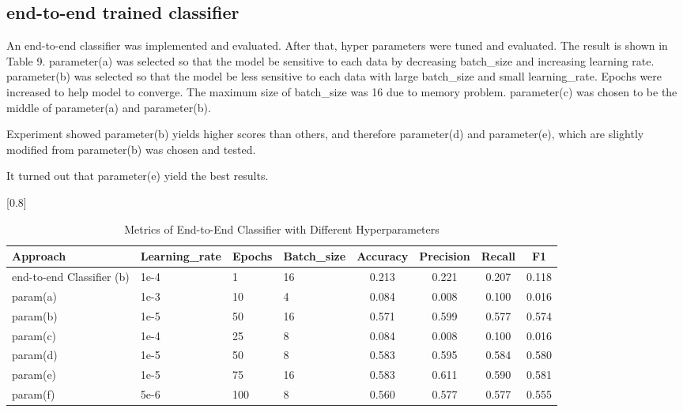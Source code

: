 \documentclass[a4paper,11pt]{article}
\begin{document}
\subsection{end-to-end trained classifier}
An end-to-end classifier was implemented and evaluated.
After that, hyper parameters were tuned and evaluated.
The result is shown  in Table 9.
parameter(a) was selected so that the model be sensitive to each data 
by decreasing batch\_size and increasing learning rate.
parameter(b) was selected so that the model be less sensitive to each data
with large batch\_size and small learning\_rate. Epochs were increased to help model to converge.
The maximum size of batch\_size was 16 due to memory problem.
parameter(c) was chosen to be the middle of parameter(a) and parameter(b).

Experiment showed parameter(b) yields higher scores than others, and therefore
parameter(d) and parameter(e), which are slightly modified from parameter(b) was chosen and tested.



It turned out that parameter(e) yield the best results.


\begin{table}[htbp]
    \caption{Metrics of End-to-End Classifier with Different Hyperparameters}
    \small
    \scalebox{0.8}[0.8]{
    \begin{tabular}{l|lll|cccc}
         Approach & Learning\_rate & Epochs & Batch\_size & Accuracy & Precision & Recall & F1 \\ \hline 
         end-to-end Classifier (b) & 1e-4& 1 & 16 & 0.213 & 0.221 &0.207 & 0.118 \\
         param(a)                  & 1e-3& 10& 4  & 0.084 & 0.008 & 0.100 & 0.016 \\
         param(b)                  & 1e-5& 50& 16 & 0.571 & 0.599 & 0.577 & 0.574 \\
         param(c)                  & 1e-4& 25& 8  & 0.084 & 0.008 & 0.100 & 0.016 \\ \hline
         param(d)                  & 1e-5& 50& 8  & 0.583 & 0.595 & 0.584 & 0.580 \\
         param(e)                  & 1e-5& 75& 16 & 0.583 & 0.611 & 0.590 & 0.581 \\
         param(f)                  & 5e-6& 100& 8 & 0.560 & 0.577 & 0.577 & 0.555 \\


    \end{tabular}

    }
\end{table}
\end{document}
